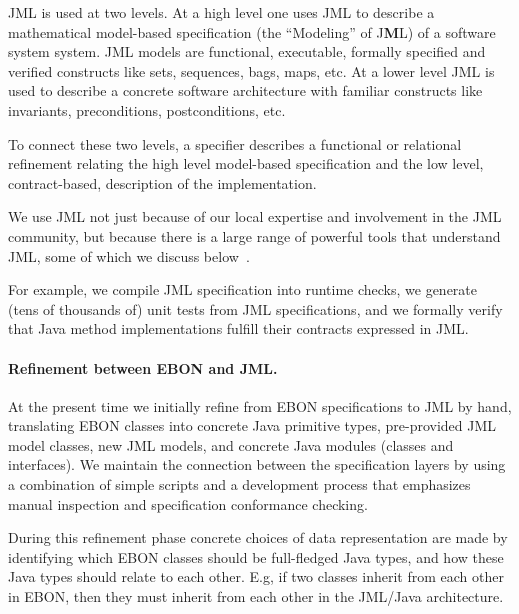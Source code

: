 \documentclass[letterpaper,twocolumn,10pt]{article}
\begin{document}
JML is used at two levels.  At a high level one uses JML to describe a
mathematical model-based specification (the ``Modeling'' of
J\textbf{M}L) of a software system system.  JML models are functional,
executable, formally specified and verified constructs like sets,
sequences, bags, maps, etc.  At a lower level JML is used to describe
a concrete software architecture with familiar constructs like
invariants, preconditions, postconditions, etc.

To connect these two levels, a specifier describes a functional or
relational refinement relating the high level model-based specification
and the low level, contract-based, description of the implementation.

We use JML not just because of our local expertise and involvement in
the JML community, but because there is a large range of powerful
tools that understand JML, some of which we discuss
below~\cite{BurdyEtal05-STTT,Leavens-etal03b}.

For example, we compile JML specification into runtime checks, we
generate (tens of thousands of) unit tests from JML specifications,
and we formally verify that Java method implementations fulfill their
contracts expressed in JML.

\paragraph{Refinement between EBON and JML.}

At the present time we initially refine from EBON specifications to
JML by hand, translating EBON classes into concrete Java primitive
types, pre-provided JML model classes, new JML models, and concrete
Java modules (classes and interfaces).  We maintain the connection
between the specification layers by using a combination of simple
scripts and a development process that emphasizes manual inspection
and specification conformance checking.

During this refinement phase concrete choices of data representation
are made by identifying which EBON classes should be full-fledged Java
types, and how these Java types should relate to each other. E.g, if two
classes inherit from each other in EBON, then they must inherit from
each other in the JML/Java architecture.  

\end{document}
